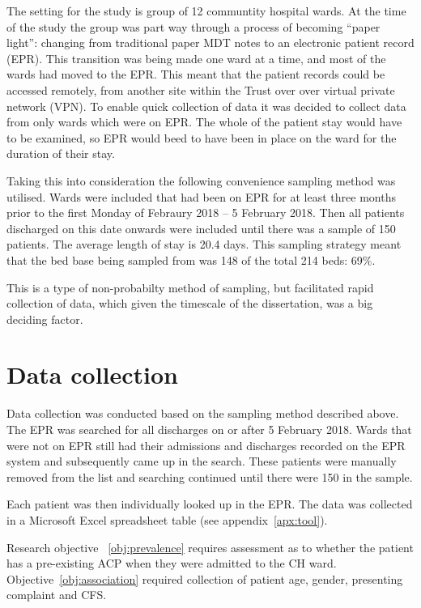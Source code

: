 \documentclass
[
	12pt,
	a4paper,
	oneside,
]{report}
\begin{document}
The setting for the study is group of 12 
communtity hospital wards. At the time of the study the group was part way 
through a process of becoming ``paper light'': changing from traditional paper
MDT notes to an electronic patient record (EPR). This transition was being made
one ward at a time, and most of the wards had moved to the EPR. This meant that 
the patient records could be accessed remotely, from another site within the 
Trust over over virtual private network (VPN). To enable quick collection of data
it was decided to collect data from only wards which were on EPR. The whole of the 
patient stay would have to be examined, so EPR would beed to have been in place
on the ward for the duration of their stay.

Taking this into consideration the following convenience sampling method was 
utilised. Wards were included that had been on EPR for at least three months
prior to the first Monday of Febraury 2018 -- 5 February 2018. Then all patients
discharged on this date onwards were included until there was a sample of 150
patients. The average length of stay is 20.4 days. This sampling strategy 
meant that the bed base being sampled from was 148 of the total 214 beds: 69\%.

This is a type of non-probabilty method of sampling, but facilitated rapid
collection of data, which given the timescale of the dissertation, was a big
deciding factor.

\section{Data collection}

Data collection was conducted based on the sampling method described above.
The EPR was searched for all discharges on or after 5 February 2018. Wards
that were not on EPR still had their admissions and discharges recorded on the
EPR system and subsequently came up in the search. These patients were 
manually removed from the list and searching continued until there were 150
in the sample.

Each patient was then individually looked up in the EPR. The data was
collected in a Microsoft Excel spreadsheet table (see appendix~\ref{apx:tool}).

Research objective~
\ref{obj:prevalence} requires assessment as to whether the patient has a
pre-existing ACP when they were admitted to the CH ward. 
Objective~\ref{obj:association} required collection of patient age, gender,
presenting complaint and CFS. 
\end{document}
